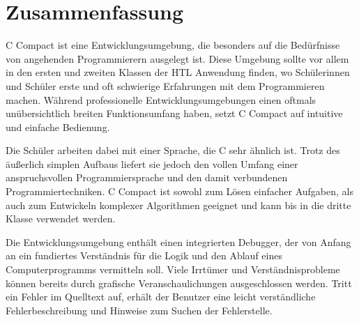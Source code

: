 

\chapter*{Zusammenfassung}




C Compact ist eine Entwicklungsumgebung, die besonders auf die Bedürfnisse von angehenden Programmierern ausgelegt ist. Diese Umgebung sollte vor allem in den ersten und zweiten Klassen der HTL Anwendung finden, wo Schülerinnen und Schüler erste und oft schwierige Erfahrungen mit dem Programmieren machen. Während professionelle Entwicklungsumgebungen einen oftmals unübersichtlich breiten Funktionsumfang haben, setzt C Compact auf intuitive und einfache Bedienung.

Die Schüler arbeiten dabei mit einer Sprache, die C sehr ähnlich ist.
Trotz des äußerlich simplen Aufbaus liefert sie jedoch den vollen Umfang einer anspruchsvollen Programmiersprache und den damit verbundenen Programmiertechniken. C Compact ist sowohl zum Lösen einfacher Aufgaben, als auch zum Entwickeln komplexer Algorithmen geeignet und kann bis in die dritte Klasse verwendet werden.

Die Entwicklungsumgebung enthält einen integrierten Debugger, der von Anfang an ein fundiertes Verständnis für die Logik und den Ablauf eines Computerprogramms vermitteln soll. Viele Irrtümer und Verständnisprobleme können bereits durch grafische Veranschaulichungen ausgeschlossen werden. Tritt ein Fehler im Quelltext auf, erhält der Benutzer eine leicht verständliche Fehlerbeschreibung und Hinweise zum Suchen der Fehlerstelle.

